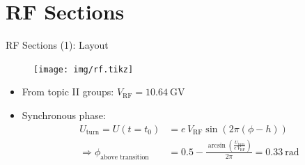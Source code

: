 \documentclass{beamer}
\begin{document}
\section{RF Sections}
\begin{frame}[t,fragile]{RF Sections (1): Layout}
\begin{figure}
\centering
\texttt{[image: img/rf.tikz]}
\end{figure}
\begin{itemize}
\item From topic II groups: $V_\text{RF}=\SI{10.64}{\giga\volt}$
\item Synchronous phase:
\begin{align*}
U_\text{turn} = U(t=t_0) &= e\,V_\text{RF} \sin\left(2\pi(\phi-h)\right)\\
\Rightarrow \phi_\text{above transition} &= 0.5 - \frac{\arcsin\left(\frac{U_\text{turn}}{e\,V_\text{RF}}\right)}{2\pi} = \SI{0.33}{\radian}
\end{align*}
\end{itemize}
\end{frame}
\end{document}
